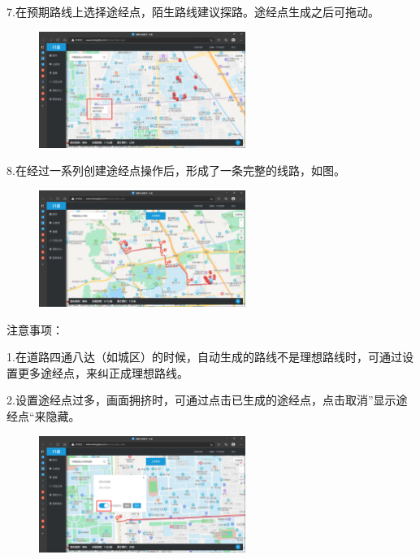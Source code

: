 \documentclass{ctexbook}
\begin{document}
7.在预期路线上选择途经点，陌生路线建议探路。途经点生成之后可拖动。
       \begin{figure}[H]
            \begin{center}
            \includegraphics[width=0.6\textwidth]{fig/行者7}
            \end{center}
        \end{figure}

8.在经过一系列创建途经点操作后，形成了一条完整的线路，如图。
       \begin{figure}[H]
            \begin{center}
            \includegraphics[width=0.6\textwidth]{fig/行者8}
            \end{center}
        \end{figure}

注意事项：

1.在道路四通八达（如城区）的时候，自动生成的路线不是理想路线时，可通过设置更多途经点，来纠正成理想路线。

2.设置途经点过多，画面拥挤时，可通过点击已生成的途经点，点击取消''显示途经点``来隐藏。
       \begin{figure}[H]
            \begin{center}
            \includegraphics[width=0.6\textwidth]{fig/行者9}
            \end{center}
        \end{figure}
\end{document}
